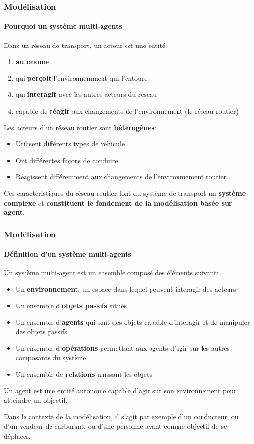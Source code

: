 \begin{frame}
    \frametitle{Modélisation}
    \framesubtitle{Pourquoi un système multi-agents}

    Dans un réseau de transport, un acteur est une entité
    \begin{enumerate}
        \item \textbf{autonome}
        \item qui \textbf{perçoit} l'environnemment qui l'entoure
        \item qui \textbf{interagit} avec les autres acteurs du réseau
        \item capable de \textbf{réagir} aux changements de l'environnement (le réseau routier)
    \end{enumerate}

    \pause{}
    Les acteurs d'un réseau routier sont \textbf{hétérogènes}:

    \begin{itemize}
        \item Utilisent différents types de véhicule
        \item Ont différentes façons de conduire
        \item Réagissent différemment aux changements de l'environmement routier
    \end{itemize}

    \pause{}
    Ces caractéristiques du réseau routier font du système de transport un \textbf{système complexe} et \textbf{constituent le fondement de la modélisation basée sur agent}.
\end{frame}

\begin{frame}
    \frametitle{Modélisation}
    \framesubtitle{Définition d'un système multi-agents}
    Un système multi-agent est un ensemble composé des éléments suivant:
    \begin{itemize}
        \item Un \textbf{environnement}, un espace dans lequel peuvent interagir des acteurs
        \item Un ensemble d'\textbf{objets passifs} situés
        \item Un ensemble d'\textbf{agents} qui sont des objets capable d'interagir et de manipuler des objets passifs
        \item Un ensemble d'\textbf{opérations} permettant aux agents d'agir sur les autres composants du système
        \item Un ensemble de \textbf{relations} unissant les objets
    \end{itemize}

    \pause{}
    Un agent est une entité autonome capable d'agir sur son environnement pour atteindre un objectif.

    Dans le contexte de la modélisation, il s'agit par exemple d'un conducteur, ou d'un vendeur de carburant, ou d'une personne ayant comme objectif de se déplacer.
\end{frame}

